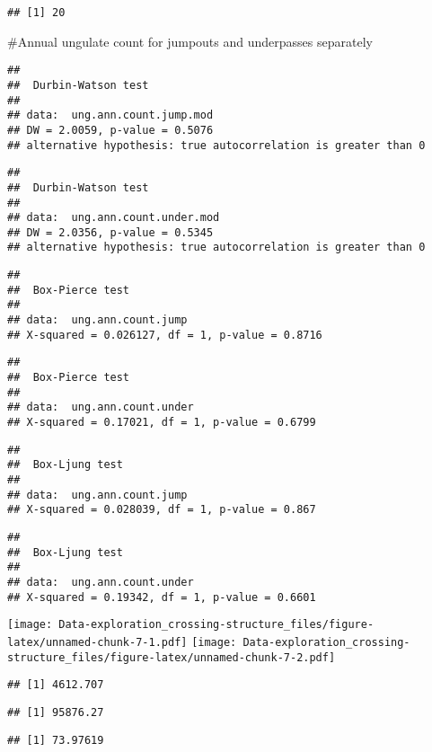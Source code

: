 \documentclass[]{article}
\begin{document}
\begin{verbatim}
## [1] 20
\end{verbatim}

\#Annual ungulate count for jumpouts and underpasses separately

\begin{verbatim}
## 
##  Durbin-Watson test
## 
## data:  ung.ann.count.jump.mod
## DW = 2.0059, p-value = 0.5076
## alternative hypothesis: true autocorrelation is greater than 0
\end{verbatim}

\begin{verbatim}
## 
##  Durbin-Watson test
## 
## data:  ung.ann.count.under.mod
## DW = 2.0356, p-value = 0.5345
## alternative hypothesis: true autocorrelation is greater than 0
\end{verbatim}

\begin{verbatim}
## 
##  Box-Pierce test
## 
## data:  ung.ann.count.jump
## X-squared = 0.026127, df = 1, p-value = 0.8716
\end{verbatim}

\begin{verbatim}
## 
##  Box-Pierce test
## 
## data:  ung.ann.count.under
## X-squared = 0.17021, df = 1, p-value = 0.6799
\end{verbatim}

\begin{verbatim}
## 
##  Box-Ljung test
## 
## data:  ung.ann.count.jump
## X-squared = 0.028039, df = 1, p-value = 0.867
\end{verbatim}

\begin{verbatim}
## 
##  Box-Ljung test
## 
## data:  ung.ann.count.under
## X-squared = 0.19342, df = 1, p-value = 0.6601
\end{verbatim}

\texttt{[image: Data-exploration\_crossing-structure\_files/figure-latex/unnamed-chunk-7-1.pdf]}
\texttt{[image: Data-exploration\_crossing-structure\_files/figure-latex/unnamed-chunk-7-2.pdf]}

\begin{verbatim}
## [1] 4612.707
\end{verbatim}

\begin{verbatim}
## [1] 95876.27
\end{verbatim}

\begin{verbatim}
## [1] 73.97619
\end{verbatim}
\end{document}
